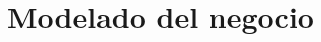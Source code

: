 \documentclass[10pt]{book}
\author{Escuela Superior de Cómputo del IPN}
\begin{document}
    \frontmatter
        \maketitle
        \makeDocInfo
        \makeObservaciones
        \makeFirmas
        \tableofcontents
        \listoffigures
        \listoftables
    \mainmatter
    


    \part{Modelado del negocio}
    \label{part:modeloNegocio}
        
        
        
        
        
        
        

\backmatter
    \makeReferenciasCruzadas
\end{document}
